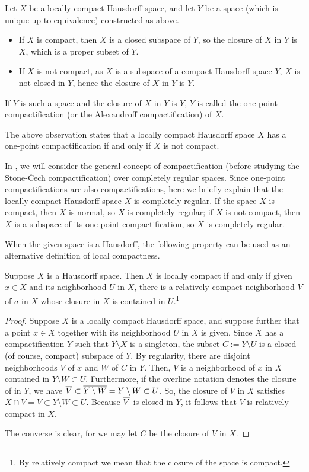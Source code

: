 Let $X$ be a locally compact Hausdorff space, and let $Y$ be a space (which is unique up to equivalence) constructed as above.
\begin{itemize}
    \item
    {
        If $X$ is compact, then $X$ is a closed subspace of $Y$, so the closure of $X$ in $Y$ is $X$, which is a proper subset of $Y$.
    }
    \item
    {
        If $X$ is not compact, as $X$ is a subspace of a compact Hausdorff space $Y$, $X$ is not closed in $Y$, hence the closure of $X$ in $Y$ is $Y$.
    }
\end{itemize}
If $Y$ is such a space and the closure of $X$ in $Y$ is $Y$, $Y$ is called the one-point compactification (or the Alexandroff compactification) of $X$.
\begin{rmk}
    The above observation states that a locally compact Hausdorff space $X$ has a one-point compactification if and only if $X$ is not compact.
\end{rmk}
\begin{rmk}
    In , we will consider the general concept of compactification (before studying the Stone-\v{C}ech compactification) over completely regular spaces.
    Since one-point compactifications are also compactifications, here we briefly explain that the locally compact Hausdorff space $X$ is completely regular.
    If the space $X$ is compact, then $X$ is normal, so $X$ is completely regular; if $X$ is not compact, then $X$ is a subspace of its one-point compactification, so $X$ is completely regular.
\end{rmk}

When the given space is a Hausdorff, the following property can be used as an alternative definition of local compactness.
\begin{prop}
    Suppose $X$ is a Hausdorff space.
    Then $X$ is locally compact if and only if given $x\in X$ and its neighborhood $U$ in $X$, there is a relatively compact neighborhood $V$ of $a$ in $X$ whose closure in $X$ is contained in $U$.\footnote{By relatively compact we mean that the closure of the space is compact.}
\end{prop}
\begin{proof}
    Suppose $X$ is a locally compact Hausdorff space, and suppose further that a point $x\in X$ together with its neighborhood $U$ in $X$ is given.
    Since $X$ has a compactification $Y$ such that $Y\setminus X$ is a singleton, the subset $C:=Y\setminus U$ is a closed (of course, compact) subspace of $Y$.
    By regularity, there are disjoint neighborhoods $V$ of $x$ and $W$ of $C$ in $Y$.
    Then, $V$ is a neighborhood of $x$ in $X$ contained in $Y\setminus W\subset U$.
    Furthermore, if the overline notation denotes the closure of in $Y$, we have $\overline{V}\subset \overline{Y\setminus W}=Y\setminus W\subset U$.
    So, the closure of $V$ in $X$ satisfies $X\cap\overline{V}=\overline{V}\subset Y\setminus W\subset U$.
    Because $\overline{V}$ is closed in $Y$, it follows that $V$ is relatively compact in $X$.

    The converse is clear, for we may let $C$ be the closure of $V$ in $X$.
\end{proof}

